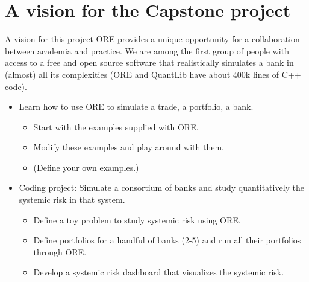 \documentclass[t]{beamer}
\begin{document}
\section{A vision for the Capstone project}

\begin{frame}{A vision for this project}
	ORE provides a unique opportunity for a collaboration between academia and practice. We are among the first group of people with access to a free and open source software that realistically simulates a bank in (almost) all its complexities (ORE and QuantLib have about 400k lines of C++ code).
	\begin{itemize}
		\item
			Learn how to use ORE to simulate a trade, a portfolio, a bank.
			\begin{itemize}
				\item 
					Start with the examples supplied with ORE.
				\item
					Modify these examples and play around with them.
				\item
					(Define your own examples.)
			\end{itemize}	
		\item
			Coding project: Simulate a consortium of banks and study quantitatively the systemic risk in that system.
			\begin{itemize}
				\item
					Define a toy problem to study systemic risk using ORE. 
				\item
					Define portfolios for a handful of banks (2-5) and run all their portfolios through ORE.
				\item
					Develop a systemic risk dashboard that visualizes the systemic risk.
			\end{itemize}
	\end{itemize}
\end{frame}
\end{document}
